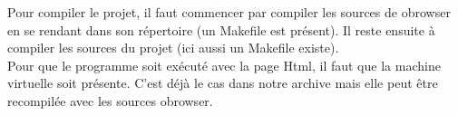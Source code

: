 \documentclass[a4paper,11pt,titlepage]{article}
\begin{document}
  Pour compiler le projet, il faut commencer par compiler les sources de obrowser en se rendant dans son répertoire (un Makefile est présent). Il reste ensuite à compiler les sources du projet (ici aussi un Makefile existe).\\

  Pour que le programme soit exécuté avec la page Html, il faut que la machine virtuelle soit présente. C'est déjà le cas dans notre archive mais elle peut être recompilée avec les sources obrowser.
\end{document}
